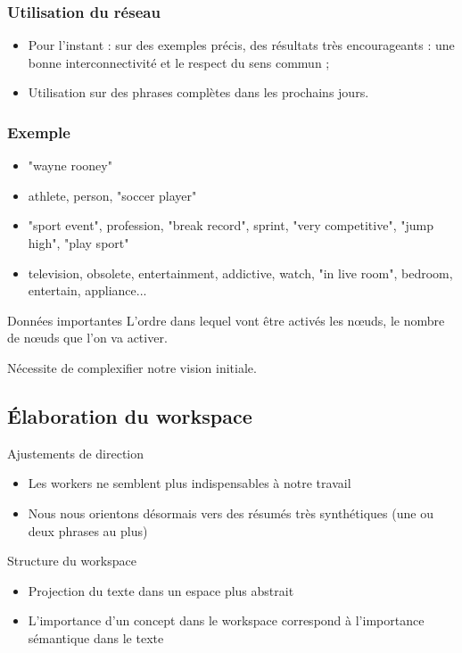 \documentclass{beamer}
\begin{document}
\begin{frame}
\frametitle{Utilisation du réseau}

\begin{itemize}
 \item Pour l'instant : sur des exemples précis, des résultats très encourageants : une bonne interconnectivité et le respect du sens commun ;
 \item Utilisation sur des phrases complètes dans les prochains jours.
\end{itemize}

\end{frame}


\begin{frame}
\frametitle{Exemple}

\begin{itemize}
 \item "wayne rooney"
 \item athlete, person, "soccer player"
 \item "sport event", profession, "break record", sprint, "very competitive", "jump high", "play sport"
 \item television, obsolete, entertainment, addictive, watch, "in live room", bedroom, entertain, appliance...
\end{itemize}

\begin{block}{Données importantes}
L'ordre dans lequel vont être activés les n\oe uds, le nombre de n\oe uds que l'on va activer.

Nécessite de complexifier notre vision initiale.
\end{block}


\end{frame}


\subsection{Élaboration du workspace}
\begin{frame}
  \begin{block}{Ajustements de direction}
    \begin{itemize}
      \item Les workers ne semblent plus indispensables à notre travail
      \item Nous nous orientons désormais vers des résumés très synthétiques (une ou deux phrases au plus)
    \end{itemize}
  \end{block}

  \begin{block}{Structure du workspace}
   \begin{itemize}
     \item Projection du texte dans un espace plus abstrait
     \item L'importance d'un concept dans le workspace correspond à l'importance sémantique dans le texte
   \end{itemize} 
  \end{block}
\end{frame}
\end{document}
